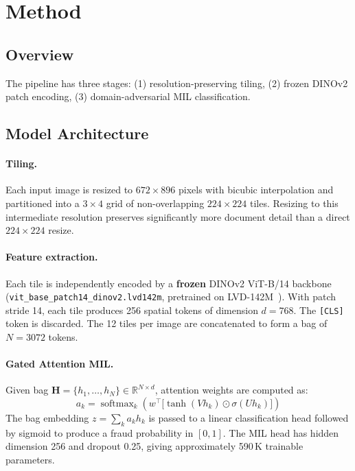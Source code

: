 \documentclass[11pt,a4paper]{article}
\begin{document}
\section{Method}
\label{sec:method}

\subsection{Overview}

The pipeline has three stages: (1) resolution-preserving tiling, (2) frozen DINOv2 patch encoding, (3) domain-adversarial MIL classification.

\subsection{Model Architecture}

\paragraph{Tiling.}
Each input image is resized to $672\times896$ pixels with bicubic interpolation and partitioned into a $3\times4$ grid of non-overlapping $224\times224$ tiles. Resizing to this intermediate resolution preserves significantly more document detail than a direct $224\times224$ resize.

\paragraph{Feature extraction.}
Each tile is independently encoded by a \textbf{frozen} DINOv2 ViT-B/14 backbone (\texttt{vit\_base\_patch14\_dinov2.lvd142m}, pretrained on LVD-142M~\cite{freuid2026}). With patch stride 14, each tile produces 256 spatial tokens of dimension $d=768$. The \texttt{[CLS]} token is discarded. The 12 tiles per image are concatenated to form a bag of $N = 3072$ tokens.

\paragraph{Gated Attention MIL.}
Given bag $\mathbf{H} = \{h_1, \ldots, h_N\} \in \mathbb{R}^{N \times d}$, attention weights are computed as:
\[
  a_k = \operatorname{softmax}_k\!\left(w^\top \bigl[\tanh(Vh_k) \odot \sigma(Uh_k)\bigr]\right)
\]
The bag embedding $z = \sum_k a_k h_k$ is passed to a linear classification head followed by sigmoid to produce a fraud probability in $[0,1]$. The MIL head has hidden dimension 256 and dropout 0.25, giving approximately 590\,K trainable parameters.
\end{document}

